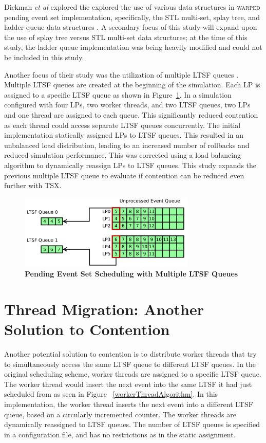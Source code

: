 \documentclass[11pt]{book}
\begin{document}
Dickman \emph{et al} explored the explored the use of various data structures in \textsc{warped}
pending event set implementation, specifically, the STL multi-set, splay tree, and ladder
queue data structures \cite{dickman}.  A secondary focus of this study will expand upon
the use of splay tree versus STL multi-set data structures; at the time of this study, the
ladder queue implementation was being heavily modified and could not be included in this
study.

Another focus of their study was the utilization of multiple LTSF queues \cite{dickman}.
Multiple LTSF queues are created at the beginning of the simulation.  Each LP is assigned
to a specific LTSF queue as shown in Figure~\ref{fig:multipleLTSF}.  In a simulation
configured with four LPs, two worker threads, and two LTSF queues, two LPs and one thread
are assigned to each queue.  This significantly reduced contention as each thread could
access separate LTSF queues concurrently.  The initial implementation statically assigned
LPs to LTSF queues.  This resulted in an unbalanced load distribution, leading to an
increased number of rollbacks and reduced simulation performance.  This was corrected
using a load balancing algorithm to dynamically reassign LPs to LTSF queues.  This study
expands the previous multiple LTSF queue to evaluate if contention can be reduced even
further with TSX.

\begin{figure}[H]
    \centering
    \graphicspath{ {./figures/} }
    \includegraphics[width=0.75\textwidth,keepaspectratio]{multiple_ltsf}
    \caption{\textbf{Pending Event Set Scheduling with Multiple LTSF Queues}}
    \label{fig:multipleLTSF}
\end{figure}

\section{Thread Migration: Another Solution to Contention}

Another potential solution to contention is to distribute worker threads that try to
simultaneously access the same LTSF queue to different LTSF queues.  In the original
scheduling scheme, worker threads are assigned to a specific LTSF queue.  The worker
thread would insert the next event into the same LTSF it had just scheduled from as seen
in Figure ~\ref{workerThreadAlgorithm}.  In this implementation, the worker thread inserts
the next event into a different LTSF queue, based on a circularly incremented counter.
The worker threads are dynamically reassigned to LTSF queues. The number of LTSF queues is
specified in a configuration file, and has no restrictions as in the static assignment.
\end{document}
